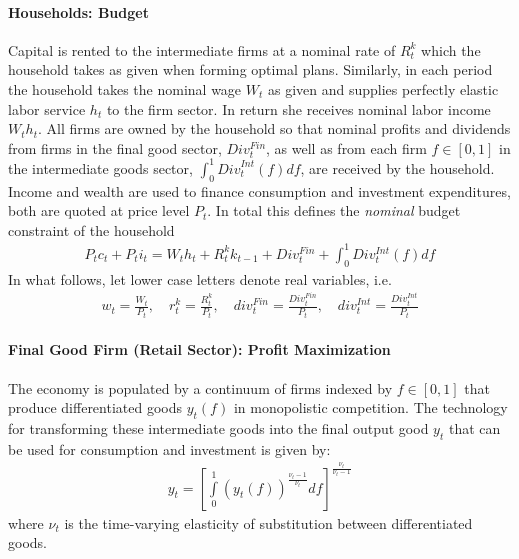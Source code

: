 \documentclass[a4paper]{scrartcl}
\begin{document}
\paragraph{Households: Budget}
Capital is rented to the intermediate firms at a nominal rate of \(R^k_{t}\) which the household takes as given when forming optimal plans.
Similarly, in each period the household takes the nominal wage \(W_t\) as given and supplies perfectly elastic labor service \(h_t\) to the firm sector.
In return she receives nominal labor income \(W_t h_t\).
All firms are owned by the household so that nominal profits and dividends from firms in the final good sector, \( Div^{Fin}_t\),
  as well as from each firm \(f\in[0,1]\) in the intermediate goods sector, \(\int_0^1 {Div}^{Int}_t(f)df\),
  are received by the household.
Income and wealth are used to finance consumption and investment expenditures, both are quoted at price level \(P_t\).
In total this defines the \emph{nominal} budget constraint of the household
\begin{align}
P_t c_t + P_t i_t =  W_t h_t + R^k_t k_{t-1} + Div^{Fin}_t + \int_0^1 Div^{Int}_t(f) df \label{eq:RBCMonopIrrInv.BudgetNominal}
\end{align}
In what follows, let lower case letters denote real variables, i.e.\
\begin{align*}
w_t = \frac{W_t}{P_t},\quad
r^k_t = \frac{R^k_t}{P_t},\quad
div^{Fin}_t = \frac{Div^{Fin}_t}{P_t},\quad
div^{Int}_t = \frac{Div^{Int}_t}{P_t}
\end{align*}

\paragraph{Final Good Firm (Retail Sector): Profit Maximization}
The economy is populated by a continuum of firms indexed by \(f \in [0,1]\) that produce differentiated goods \(y_t(f)\) in monopolistic competition.
The technology for transforming these intermediate goods into the final output good \(y_t\) that can be used for consumption and investment is given by:
\begin{align}
y_t = {\left[\int\limits_0^1 {(y_t(f))}^{\frac{\nu_t-1}{\nu_t}}df\right]}^{\frac{\nu_t}{\nu_t-1}} \label{eq:RBCMonopIrrInv.Firms.Aggregator}
\end{align}
where \(\nu_t\) is the time-varying elasticity of substitution between differentiated goods.
\end{document}
